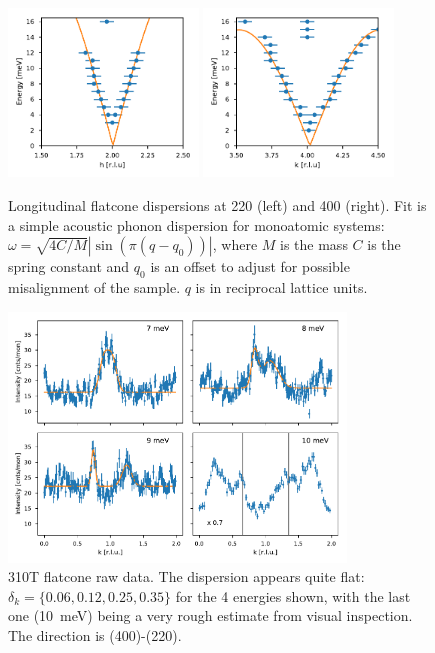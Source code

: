 \begin{figure}
    \centering
    \includegraphics[width=0.45\textwidth]{fig/lowen/dispersion_220L.pdf}
    \includegraphics[width=0.45\textwidth]{fig/lowen/dispersion_400L.pdf}
    \caption[flatcone dispersion 220L/400L]{Longitudinal flatcone dispersions at 220 (left) and 400 (right). Fit is a simple acoustic phonon dispersion for monoatomic systems: $\omega = \sqrt{4C/M} | \sin ( \pi (q-q_0) ) | $, where $M$ is the mass $C$ is the spring constant and $q_0$ is an offset to adjust for possible misalignment of the sample. $q$ is in reciprocal lattice units.}
    \label{fig:longitudinal_phonons_flatcone}
\end{figure}

\begin{figure}
    \centering
    \includegraphics[width=0.8\textwidth]{fig/lowen/fits_310T.pdf}
    \caption[310T flatcone raw data]{310T flatcone raw data. The dispersion appears quite flat: $\delta_k = \{ 0.06, 0.12, 0.25, 0.35 \}$ for the 4 energies shown, with the last one (\SI{10}{\milli\eV}) being a very rough estimate from visual inspection. The direction is (400)-(220).}
    \label{fig:flatcone_phonons_310T_raw}    
\end{figure}

